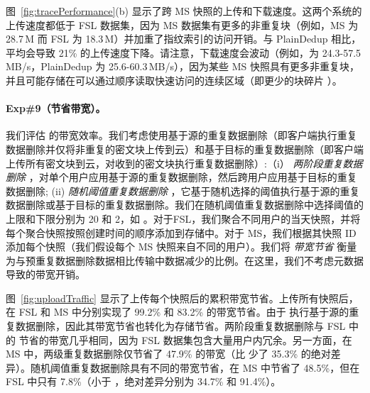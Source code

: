 图~\ref{fig:tracePerformance}(b) 显示了跨 MS 快照的上传和下载速度。这两个系统的上传速度都低于 FSL 数据集，因为 MS 数据集有更多的非重复块（例如，MS 为 28.7\,M 而 FSL 为 18.3\,M）并加重了指纹索引的访问开销。与 PlainDedup 相比，\sysnameS 平均会导致 21\% 的上传速度下降。请注意，下载速度会波动（例如，\sysnameS 为 24.3-57.5\,MB/s，PlainDedup 为 25.6-60.3\,MB/s），因为某些 MS 快照具有更多非重复块，并且可能存储在可以通过顺序读取快速访问的连续区域（即更少的块碎片 \cite{lillibridge13}）。

\paragraph{Exp\#9（节省带宽）。} 我们评估 \sysnameS 的带宽效率。我们考虑使用基于源的重复数据删除（即客户端执行重复数据删除并仅将非重复的密文块上传到云）和基于目标的重复数据删除（即客户端上传所有密文块到云，对收到的密文块执行重复数据删除）:（i）\textit{ 两阶段重复数据删除} \cite{li15}，对单个用户应用基于源的重复数据删除，然后跨用户应用基于目标的重复数据删除; (ii) \textit{ 随机阈值重复数据删除} \cite{harnik10}，它基于随机选择的阈值执行基于源的重复数据删除或基于目标的重复数据删除。我们在随机阈值重复数据删除中选择阈值的上限和下限分别为 20 和 2，如 \cite{harnik10}。对于FSL，我们聚合不同用户的当天快照，并将每个聚合快照按照创建时间的顺序添加到存储中。对于 MS，我们根据其快照 ID 添加每个快照（我们假设每个 MS 快照来自不同的用户）。我们将 \textit{ 带宽节省} 衡量为与预重复数据删除数据相比传输中数据减少的比例。在这里，我们不考虑元数据导致的带宽开销。

图~\ref{fig:uploadTraffic} 显示了上传每个快照后的累积带宽节省。上传所有快照后，\sysnameS 在 FSL 和 MS 中分别实现了 99.2\% 和 83.2\% 的带宽节省。由于 \sysnameS 执行基于源的重复数据删除，因此其带宽节省也转化为存储节省。两阶段重复数据删除与 FSL 中的 \sysnameS 节省的带宽几乎相同，因为 FSL 数据集包含大量用户内冗余。另一方面，在 MS 中，两级重复数据删除仅节省了 47.9\% 的带宽（比 \sysnameS 少了 35.3\% 的绝对差异）。随机阈值重复数据删除具有不同的带宽节省，在 MS 中节省了 48.5\%，但在 FSL 中只有 7.8\%（小于 \sysnameS，绝对差异分别为 34.7\% 和 91.4\%）。

